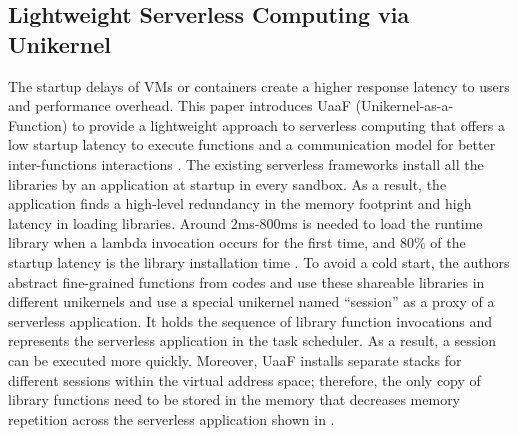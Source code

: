\subsection*{Lightweight Serverless Computing via Unikernel}
The startup delays of VMs or containers create a higher response latency to users and performance overhead. This paper introduces UaaF (Unikernel-as-a-Function) to provide a lightweight approach to serverless computing that offers a low startup latency to execute functions and a communication model for better inter-functions interactions \cite{tan2020unikernel}. The existing serverless frameworks install all the libraries by an application at startup in every sandbox. As a result, the application finds a high-level redundancy in the memory footprint and high latency in loading libraries. Around 2ms-800ms is needed to load the runtime library when a lambda invocation occurs for the first time, and 80\% of the startup latency is the library installation time \cite{verma2015google}. To avoid a cold start, the authors abstract fine-grained functions from codes and use these shareable libraries in different unikernels and use a special unikernel named ``session'' as a proxy of a serverless application. It holds the sequence of library function invocations and represents the serverless application in the task scheduler. As a result, a session can be executed more quickly. Moreover, UaaF installs separate stacks for different sessions within the virtual address space; therefore, the only copy of library functions need to be stored in the memory that decreases memory repetition across the serverless application shown in .

